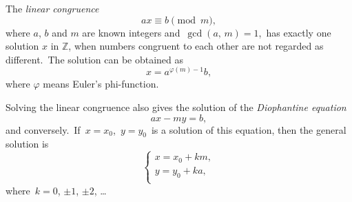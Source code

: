 \documentclass[12pt]{article}
\begin{document}
The {\em linear congruence}
                $$ax\equiv b \pmod{m},$$
where $a$, $b$ and $m$ are known integers and\, $\gcd{(a,\,m)} = 1$,\, has exactly one solution $x$ in $\mathbb{Z}$, when numbers congruent to each other are not regarded as different.\, The solution can be obtained as
                 $$x = a^{\varphi(m)-1}b,$$
where $\varphi$ means Euler's phi-function.

Solving the linear congruence also gives the solution of the {\em Diophantine equation}
                    $$ax\!-\!my = b,$$
and conversely.\, If\, $x = x_0$,\, $y = y_0$\, is a solution of this equation, then the general solution is
\[\begin{cases}
x = x_0\!+\!km,\\
y = y_0\!+\!ka,\\
\end{cases}\]
where\, $k = 0$, $\pm1$, $\pm2$, \ldots
\end{document}
